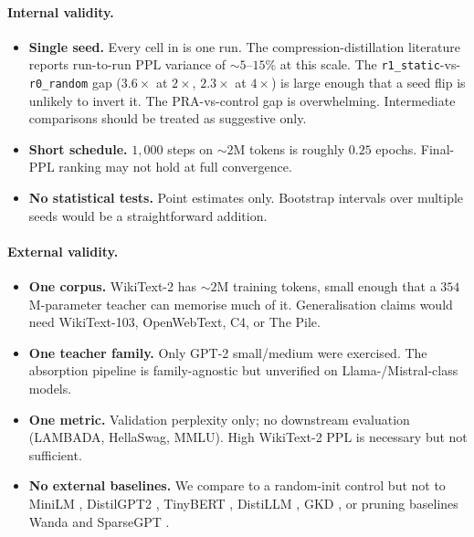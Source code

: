 \documentclass[11pt]{article}
\newcommand{\PPL}{\ensuremath{\mathrm{PPL}}}
\newcommand{\pra}{\textsc{PRA}}
\begin{document}
\paragraph{Internal validity.}
\begin{itemize}[leftmargin=*,nosep]
  \item \textbf{Single seed.} Every cell in  is one run.
        The compression-distillation literature reports run-to-run
        \PPL{} variance of $\sim\!5$--$15\%$ at this scale. The
        \texttt{r1\_static}-vs-\texttt{r0\_random} gap ($3.6\times$ at
        $2\times$, $2.3\times$ at $4\times$) is large enough that a
        seed flip is unlikely to invert it. The \pra{}-vs-control gap
        is overwhelming. Intermediate comparisons should be treated as
        suggestive only.
  \item \textbf{Short schedule.} $1{,}000$ steps on $\sim\!2$M tokens is
        roughly $0.25$ epochs. Final-\PPL{} ranking may not hold at
        full convergence.
  \item \textbf{No statistical tests.} Point estimates only. Bootstrap
        intervals over multiple seeds would be a straightforward
        addition.
\end{itemize}

\paragraph{External validity.}
\begin{itemize}[leftmargin=*,nosep]
  \item \textbf{One corpus.} WikiText-2 has $\sim\!2$M training tokens,
        small enough that a $354$M-parameter teacher can memorise much
        of it. Generalisation claims would need WikiText-103,
        OpenWebText, C4, or The Pile.
  \item \textbf{One teacher family.} Only GPT-2 small/medium were
        exercised. The absorption pipeline is family-agnostic but
        unverified on Llama-/Mistral-class models.
  \item \textbf{One metric.} Validation perplexity only; no downstream
        evaluation (LAMBADA, HellaSwag, MMLU). High WikiText-2 \PPL{}
        is necessary but not sufficient.
  \item \textbf{No external baselines.} We compare to a random-init
        control but not to MiniLM \citep{Wang2020MiniLM},
        DistilGPT2 \citep{Sanh2019DistilBERT},
        TinyBERT \citep{Jiao2020TinyBERT},
        DistiLLM \citep{Ko2024DistiLLM},
        GKD \citep{Agarwal2024GKD},
        or pruning baselines Wanda \citep{Sun2023Wanda} and
        SparseGPT \citep{Frantar2023SparseGPT}.
\end{itemize}
\end{document}

